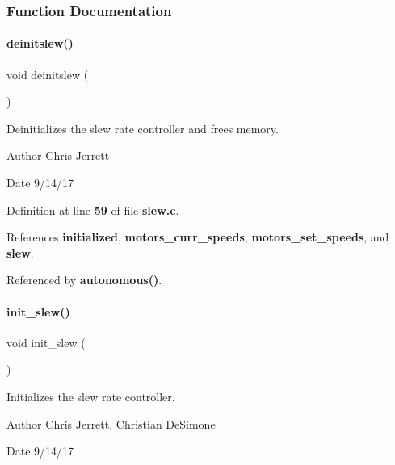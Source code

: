 \subsubsection{Function Documentation}
\mbox{\label{slew_8c_a981c9990a969d2587e66e550737f7cd9}} 
\paragraph{deinitslew()}
{\footnotesize\ttfamily void deinitslew (\begin{DoxyParamCaption}{ }\end{DoxyParamCaption})}



Deinitializes the slew rate controller and frees memory. 

\begin{DoxyAuthor}{Author}
Chris Jerrett 
\end{DoxyAuthor}
\begin{DoxyDate}{Date}
9/14/17 
\end{DoxyDate}


Definition at line \textbf{ 59} of file \textbf{ slew.\+c}.



References \textbf{ initialized}, \textbf{ motors\+\_\+curr\+\_\+speeds}, \textbf{ motors\+\_\+set\+\_\+speeds}, and \textbf{ slew}.



Referenced by \textbf{ autonomous()}.

\mbox{\label{slew_8c_a321758941d88b75783955c819bb75005}} 
\paragraph{init\+\_\+slew()}
{\footnotesize\ttfamily void init\+\_\+slew (\begin{DoxyParamCaption}{ }\end{DoxyParamCaption})}



Initializes the slew rate controller. 

\begin{DoxyAuthor}{Author}
Chris Jerrett, Christian De\+Simone 
\end{DoxyAuthor}
\begin{DoxyDate}{Date}
9/14/17 
\end{DoxyDate}


